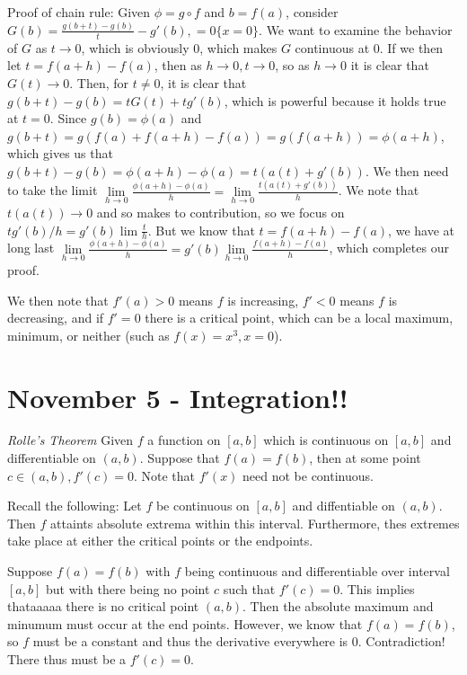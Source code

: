 \documentclass{report}
\begin{document}
Proof of chain rule: Given $\phi = g \circ f$ and $b = f(a)$, consider $G(b) = \frac{g(b+t)-g(b)}{t} - g'(b), = 0 \{x=0\}$. We want to examine the behavior of $G$ as $t \to 0$, which is obviously $0$, which makes $G$ continuous at $0$. If we then let $t = f(a+h) - f(a)$, then as $h \to 0, t\to 0$, so as $h \to 0$ it is clear that $G(t) \to 0$. Then, for $t \neq 0$, it is clear that $g(b+t) - g(b) = tG(t) + tg'(b)$, which is powerful because it holds true at $t=0$. Since $g(b) = \phi(a)$ and $g(b+t) = g(f(a) + f(a+h) - f(a)) = g(f(a+h)) = \phi(a+h)$, which gives us that $g(b+t) - g(b) = \phi(a+h) - \phi(a) = t(a(t) + g'(b))$. We then need to take the limit $\displaystyle\lim\limits_{h \to 0}{\frac{\phi(a+h) - \phi(a)}{h}} = \displaystyle\lim\limits_{h \to 0}{\frac{t(a(t) + g'(b))}{h}}$. We note that $t(a(t)) \to 0$ and so makes to contribution, so we focus on $tg'(b)/h = g'(b) \lim{\frac{t}{h}}$. But we know that $t = f(a+h) - f(a)$, we have at long last $\displaystyle\lim\limits_{h \to 0}{\frac{\phi(a+h)-\phi(a)}{h}} = g'(b)\displaystyle\lim\limits_{h\to 0}{\frac{f(a + h) - f(a)}{h}}$, which completes our proof. 

We then note that $f'(a) > 0$ means $f$ is increasing, $f' < 0$ means $f$ is decreasing, and if $f' = 0$ there is a critical point, which can be a local maximum, minimum, or neither (such as $f(x) = x^3, x=0$). 

\chapter{November 5 - Integration!!}

\emph{Rolle's Theorem} Given $f$ a function on $[a,b]$ which is continuous on $[a, b]$ and differentiable on $(a,b)$. Suppose that $f(a) = f(b)$, then at some point $c \in (a,b), f'(c) = 0$. Note that $f'(x)$ need not be continuous. 

Recall the following: Let $f$ be continuous on $[a,b]$ and diffentiable on $(a,b)$. Then $f$ attaints absolute extrema within this interval. Furthermore, thes extremes take place at either the critical points or the endpoints.

Suppose $f(a) = f(b)$ with $f$ being continuous and differentiable over interval $[a,b]$ but with there being no point $c$ such that $f'(c) = 0$. This implies thataaaaa there is no critical point $(a,b)$. Then the absolute maximum and minumum must occur at the end points. However, we know that $f(a) = f(b)$, so $f$ must be a constant and thus the derivative everywhere is $0$. Contradiction! There thus must be a $f'(c) = 0$. 
\end{document}
